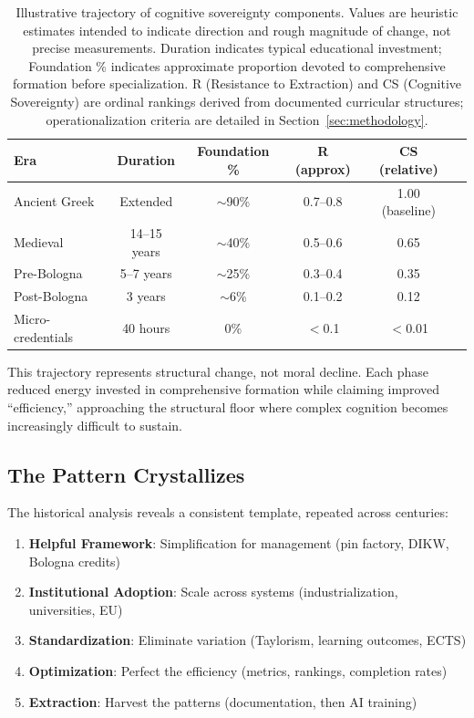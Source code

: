 \begin{table}[htbp]
\centering
\begin{tabular}{lccccc}
\toprule
\textbf{Era} & \textbf{Duration} & \textbf{Foundation \%} & \textbf{R (approx)} & \textbf{CS (relative)} \\
\midrule
Ancient Greek & Extended & $\sim$90\% & 0.7--0.8 & 1.00 (baseline) \\
Medieval & 14--15 years & $\sim$40\% & 0.5--0.6 & 0.65 \\
Pre-Bologna & 5--7 years & $\sim$25\% & 0.3--0.4 & 0.35 \\
Post-Bologna & 3 years & $\sim$6\% & 0.1--0.2 & 0.12 \\
Micro-credentials & 40 hours & 0\% & $<$0.1 & $<$0.01 \\
\bottomrule
\end{tabular}
\caption{Illustrative trajectory of cognitive sovereignty components. Values are heuristic estimates intended to indicate direction and rough magnitude of change, not precise measurements. Duration indicates typical educational investment; Foundation \% indicates approximate proportion devoted to comprehensive formation before specialization. R (Resistance to Extraction) and CS (Cognitive Sovereignty) are ordinal rankings derived from documented curricular structures; operationalization criteria are detailed in Section~\ref{sec:methodology}.}
\label{tab:thermodynamic-gradient}
\end{table}

This trajectory represents structural change, not moral decline. Each phase reduced energy invested in comprehensive formation while claiming improved ``efficiency,'' approaching the structural floor where complex cognition becomes increasingly difficult to sustain.

\subsection{The Pattern Crystallizes}

The historical analysis reveals a consistent template, repeated across centuries:

\begin{enumerate}
    \item \textbf{Helpful Framework}: Simplification for management (pin factory, DIKW, Bologna credits)
    \item \textbf{Institutional Adoption}: Scale across systems (industrialization, universities, EU)
    \item \textbf{Standardization}: Eliminate variation (Taylorism, learning outcomes, ECTS)
    \item \textbf{Optimization}: Perfect the efficiency (metrics, rankings, completion rates)
    \item \textbf{Extraction}: Harvest the patterns (documentation, then AI training)
\end{enumerate}

